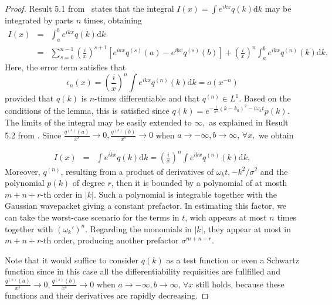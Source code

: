 \documentclass[notitlepage, prx, preprint, amsmath,superscriptaddress,amssymb]{revtex4-1}
\begin{document}
\begin{proof}
Result 5.1 from\ \cite{Olver} states that the integral $I(x) = \int e^{i k x} q(k) \mathrm{d}k$ may be integrated by parts $n$ times, obtaining
\begin{eqnarray*}
I(x) &=& \int_a^b e^{i k x} q(k) \mathrm{d}k \\
&=&\sum_{s=0}^{n-1} \left(\frac{i}{x}\right)^{s+1} \left[e^{iax} q^{(s)}(a) - e^{ibx} q^{(s)}(b) \right] + \left(\frac{i}{x}\right)^n \int_a^b  e^{ikx} q^{(n)}(k)\mathrm{d}k,
\end{eqnarray*} Here, the error term satisfies that
$$ \epsilon_n(x) =  \left(\frac{i}{x}\right)^n\int e^{ikx} q^{(n)}(k)\mathrm{d}k = o(x^{-n})$$
provided that $q(k)$ is $n$-times differentiable and that $q^{(n)} \in L^1$. Based on the conditions of the lemma, this is satisfied since $q(k)=e^{- \frac{1}{\sigma^2}{(k-k_0)^2} - i \omega_k t} p(k)$. The limits of the integral may be easily extended to $\infty,$ as explained in Result 5.2 from \cite{Olver}. Since $\frac{q^{(s)}(a)}{x^s} \to 0,  \frac{q^{(s)}(b)}{x^s} \to 0$ when $a\to -\infty, b\to \infty, \, \forall x, $ we obtain

\begin{eqnarray*}
I(x) &=& \int e^{i k x} q(k) \mathrm{d}k = \left(\frac{i}{x}\right)^n \int e^{ikx} q^{(n)}(k)\mathrm{d}k,
\end{eqnarray*}
Moreover, $q^{(n)}$, resulting from a product of derivatives of $\omega_k t, -k^2/\sigma^2$ and the polynomial $p(k)$ of degree $r$, then it is bounded by a polynomial of at mosth $m+n + r$-th order in $|k|.$ Such a polynomial is integrable together with the Gaussian wavepacket giving a constant prefactor. In estimating this factor, we can take the worst-case scenario for the terms in $t$, wich appears at most $n$ times together with $(\omega_k')^n$. Regarding the monomials in $|k|$, they appear at most in $m+n + r$-th order, producing another prefactor $\sigma^{m+n+ r}$.

Note that it would suffice to consider $q(k)$ as a test function or even a Schwartz function since in this case all the differentiability requisities are fullfilled and  $\frac{q^{(s)}(a)}{x^s} \to 0,  \frac{q^{(s)}(b)}{x^s} \to 0$ when $a\to -\infty, b\to \infty, \, \forall x $ still holds, because these functions and their derivatives are rapidly decreasing.

\end{proof}
\end{document}
